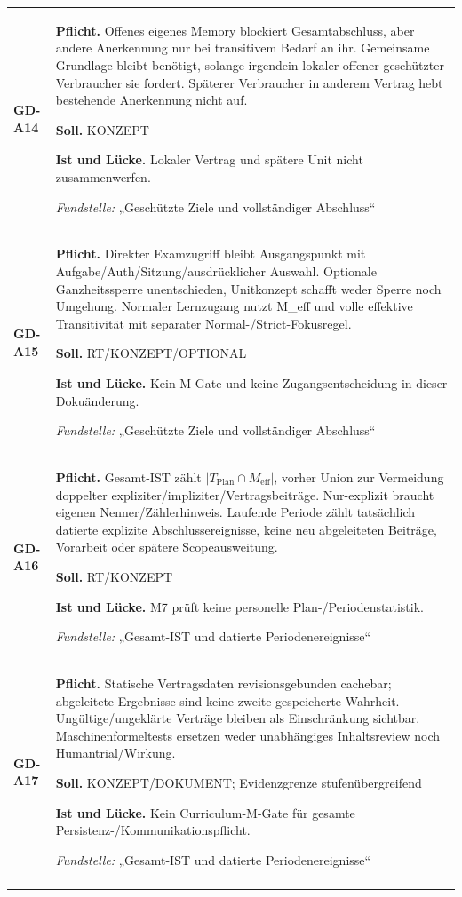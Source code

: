 \begin{longtable}{@{}P{20mm}P{128mm}@{}}
\label{rule:GD-A14}\textbf{GD-A14} &
\textbf{Pflicht.} Offenes eigenes Memory blockiert Gesamtabschluss, aber andere Anerkennung nur bei transitivem Bedarf an ihr. Gemeinsame Grundlage bleibt benötigt, solange irgendein lokaler offener geschützter Verbraucher sie fordert. Späterer Verbraucher in anderem Vertrag hebt bestehende Anerkennung nicht auf.\par\smallskip
\textbf{Soll.} KONZEPT\par\smallskip
\textbf{Ist und Lücke.} Lokaler Vertrag und spätere Unit nicht zusammenwerfen.\par\smallskip
\emph{Fundstelle:} „Geschützte Ziele und vollständiger Abschluss“\\\addlinespace[5pt]
\label{rule:GD-A15}\textbf{GD-A15} &
\textbf{Pflicht.} Direkter Examzugriff bleibt Ausgangspunkt mit Aufgabe/Auth/Sitzung/ausdrücklicher Auswahl. Optionale Ganzheitssperre unentschieden, Unitkonzept schafft weder Sperre noch Umgehung. Normaler Lernzugang nutzt M\_eff und volle effektive Transitivität mit separater Normal-/Strict-Fokusregel.\par\smallskip
\textbf{Soll.} RT/KONZEPT/OPTIONAL\par\smallskip
\textbf{Ist und Lücke.} Kein M-Gate und keine Zugangsentscheidung in dieser Dokuänderung.\par\smallskip
\emph{Fundstelle:} „Geschützte Ziele und vollständiger Abschluss“\\\addlinespace[5pt]
\label{rule:GD-A16}\textbf{GD-A16} &
\textbf{Pflicht.} Gesamt-IST zählt \(\lvert T_{\mathrm{Plan}}\cap M_{\mathrm{eff}}\rvert\), vorher Union zur Vermeidung doppelter expliziter/impliziter/Vertragsbeiträge. Nur-explizit braucht eigenen Nenner/Zählerhinweis. Laufende Periode zählt tatsächlich datierte explizite Abschlussereignisse, keine neu abgeleiteten Beiträge, Vorarbeit oder spätere Scopeausweitung.\par\smallskip
\textbf{Soll.} RT/KONZEPT\par\smallskip
\textbf{Ist und Lücke.} M7 prüft keine personelle Plan-/Periodenstatistik.\par\smallskip
\emph{Fundstelle:} „Gesamt-IST und datierte Periodenereignisse“\\\addlinespace[5pt]
\label{rule:GD-A17}\textbf{GD-A17} &
\textbf{Pflicht.} Statische Vertragsdaten revisionsgebunden cachebar; abgeleitete Ergebnisse sind keine zweite gespeicherte Wahrheit. Ungültige/ungeklärte Verträge bleiben als Einschränkung sichtbar. Maschinenformeltests ersetzen weder unabhängiges Inhaltsreview noch Humantrial/Wirkung.\par\smallskip
\textbf{Soll.} KONZEPT/DOKUMENT; Evidenzgrenze stufenübergreifend\par\smallskip
\textbf{Ist und Lücke.} Kein Curriculum-M-Gate für gesamte Persistenz-/Kommunikationspflicht.\par\smallskip
\emph{Fundstelle:} „Gesamt-IST und datierte Periodenereignisse“\\\addlinespace[5pt]
\bottomrule
\end{longtable}
\endgroup

